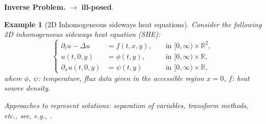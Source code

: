 \documentclass[oneside]{article}
\numberwithin{equation}{section}
\newtheorem{example}{Example}[section]
\begin{document}
\textbf{Inverse Problem.}  $\to$ \textbf{ill-posed}.
\begin{example}[2D Inhomogeneous sideways heat equations]
    Consider the following 2D inhomogeneous sideways heat equation (SHE):
    \begin{equation}
        \label{2D inhomogeneous sideways heat equation}
        \tag{2D-iSHE}
        \left\{\begin{split}
            \partial_tu - \Delta u &= f(t,x,y), &&\mbox{ in } [0,\infty)\times\mathbb{R}^2,\\
            u(t,0,y) &= \phi(t,y), &&\mbox{ in } [0,\infty)\times\mathbb{R},\\
            \partial_xu(t,0,y) &= \psi(t,y) &&\mbox{ in } [0,\infty)\times\mathbb{R},
        \end{split}\right.
    \end{equation}
    where $\phi$, $\psi$: \emph{temperature, flux data} given in the \emph{accessible region} $x = 0$, $f$: heat source density.
    
    Approaches to represent solutions: separation of variables, transform methods, etc., see, e.g., \cite{Evans2010}.
    

\end{example}
\end{document}
